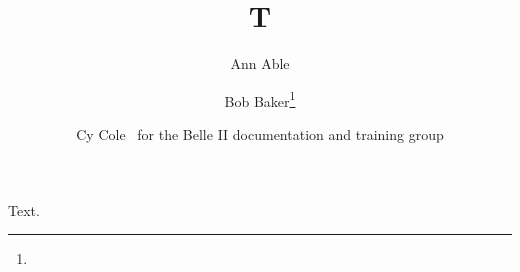 \documentclass{llncs}
\begin{document}
\title{T}
\author{
        Ann Able
        \and
        Bob Baker\thanks{} \and
        Cy Cole
        \ for the Belle II documentation and training group
}
\maketitle
Text.
\end{document}
